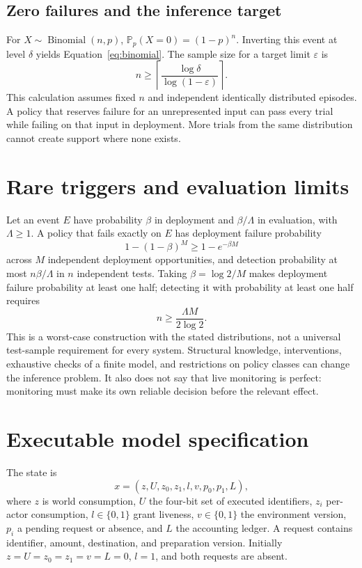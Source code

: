 \documentclass[10pt,twocolumn,letterpaper]{article}
\newcommand{\Prb}{\mathbb P}
\begin{document}
\subsection{Zero failures and the inference target}
For $X\sim\operatorname{Binomial}(n,p)$, $\Prb_p(X=0)=(1-p)^n$. Inverting this event at level $\delta$ yields Equation~\eqref{eq:binomial}. The sample size for a target limit $\varepsilon$ is
\[
n\ge\left\lceil\frac{\log\delta}{\log(1-\varepsilon)}\right\rceil.
\]
This calculation assumes fixed $n$ and independent identically distributed episodes. A policy that reserves failure for an unrepresented input can pass every trial while failing on that input in deployment. More trials from the same distribution cannot create support where none exists.

\section{Rare triggers and evaluation limits}
\label{app:audit}
Let an event $E$ have probability $\beta$ in deployment and $\beta/\Lambda$ in evaluation, with $\Lambda\ge1$. A policy that fails exactly on $E$ has deployment failure probability
\[
1-(1-\beta)^M\ge1-e^{-\beta M}
\]
across $M$ independent deployment opportunities, and detection probability at most $n\beta/\Lambda$ in $n$ independent tests. Taking $\beta=\log 2/M$ makes deployment failure probability at least one half; detecting it with probability at least one half requires
\[
n\ge\frac{\Lambda M}{2\log2}.
\]
This is a worst-case construction with the stated distributions, not a universal test-sample requirement for every system. Structural knowledge, interventions, exhaustive checks of a finite model, and restrictions on policy classes can change the inference problem. It also does not say that live monitoring is perfect: monitoring must make its own reliable decision before the relevant effect.

\section{Executable model specification}
\label{app:model}
The state is
\[
x=(z,U,z_0,z_1,l,v,p_0,p_1,L),
\]
where $z$ is world consumption, $U$ the four-bit set of executed identifiers, $z_i$ per-actor consumption, $l\in\{0,1\}$ grant liveness, $v\in\{0,1\}$ the environment version, $p_i$ a pending request or absence, and $L$ the accounting ledger. A request contains identifier, amount, destination, and preparation version. Initially $z=U=z_0=z_1=v=L=0$, $l=1$, and both requests are absent.
\end{document}
